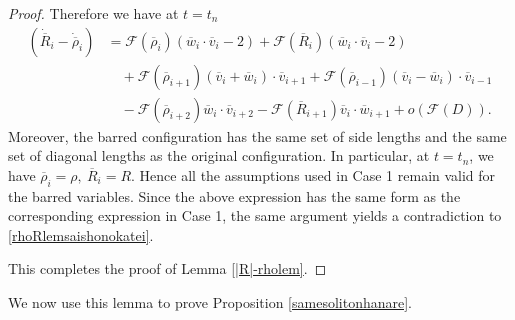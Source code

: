 \documentclass[10pt,a4paper]{amsart}
\numberwithin{equation}{section}
\begin{document}
\begin{proof}
Therefore we have at $t=t_n$
\begin{align*}
\left(\dot{\overline{R}}_i-\dot{\overline{\rho}}_i\right)&=\mathcal{F}(\overline{\rho}_i)(\overline{w}_i\cdot \overline{v}_i-2)+\mathcal{F}(\overline{R}_i)(\overline{w}_i\cdot \overline{v}_i-2)
\\
&\quad +\mathcal{F}(\overline{\rho}_{i+1})(\overline{v}_i+\overline{w}_i)\cdot \overline{v}_{i+1}+\mathcal{F}(\overline{\rho}_{i-1})(\overline{v}_i-\overline{w}_i)\cdot \overline{v}_{i-1}
\\
&\quad -\mathcal{F}(\overline{\rho}_{i+2})\overline{w}_i\cdot \overline{v}_{i+2}-\mathcal{F}(\overline{R}_{i+1})\overline{v}_i\cdot \overline{w}_{i+1}+o\left(\mathcal{F}(D)\right).
\end{align*}
Moreover, the barred configuration has the same set of side lengths and the same set of diagonal lengths as the original configuration. In particular, at $t=t_n$, we have $\overline{\rho}_i=\rho,\ \overline{R}_i=R$. Hence all the assumptions used in Case 1 remain valid for the barred variables. Since the above expression has the same form as the corresponding expression in Case 1, the same argument yields a contradiction to \eqref{rhoRlemsaishonokatei}.

This completes the proof of Lemma \ref{|R|-rholem}.

\end{proof}



We now use this lemma to prove Proposition \ref{samesolitonhanare}.
\end{document}
